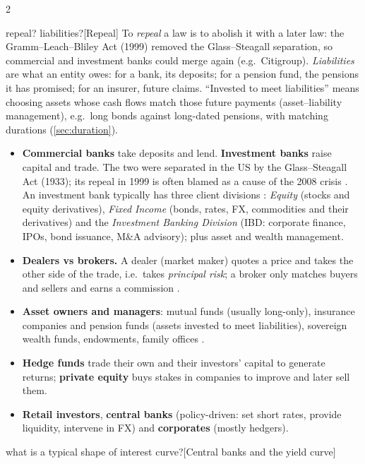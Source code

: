 \begin{paracol}{2}
\begin{answer}{repeal? liabilities?}[Repeal]
To \emph{repeal} a law is to abolish it with a later law: the Gramm--Leach--Bliley Act (1999) removed
the Glass--Steagall separation, so commercial and investment banks could merge again (e.g.\
Citigroup).
\emph{Liabilities} are what an entity owes: for a bank, its deposits; for a pension fund,
the pensions it has promised; for an insurer, future claims. ``Invested to meet liabilities'' means
choosing assets whose cash flows match those future payments (asset--liability management), e.g.\ long
bonds against long-dated pensions, with matching durations (\cref{sec:duration}).
\end{answer}
\begin{itemize}
  \item \textbf{Commercial banks} take deposits and lend. \textbf{Investment banks} raise
        capital and trade. The two were separated in the US by the Glass--Steagall Act (1933);
        its repeal in 1999 is often blamed as a cause of the 2008 crisis \ts{13}{1}{17:44}.
        An investment bank typically has three client divisions \ts{24}{1-II}{17:45}:
        \emph{Equity} (stocks and equity derivatives), \emph{Fixed Income} (bonds, rates, FX,
        commodities and their derivatives) and the \emph{Investment Banking Division} (IBD:
        corporate finance, IPOs, bond issuance, M\&A advisory); plus asset and wealth
        management.
  \item \textbf{Dealers vs brokers.} A dealer (market maker) quotes a price and takes the other
        side of the trade, i.e.\ takes \emph{principal risk}; a broker only matches buyers and
        sellers and earns a commission \ts{13}{1}{23:00}.
  \item \textbf{Asset owners and managers}: mutual funds (usually long-only), insurance companies
        and pension funds (assets invested to meet liabilities), sovereign wealth funds,
        endowments, family offices \ts{13}{1}{24:04}.
  \item \textbf{Hedge funds} trade their own and their investors' capital to generate returns;
        \textbf{private equity} buys stakes in companies to improve and later sell them.
  \item \textbf{Retail investors}, \textbf{central banks} (policy-driven: set short rates,
        provide liquidity, intervene in FX) and \textbf{corporates} (mostly hedgers).
\end{itemize}
\begin{answer}{what is a typical shape of interest curve?}[Central banks and the yield curve]

\end{answer}
\end{paracol}
